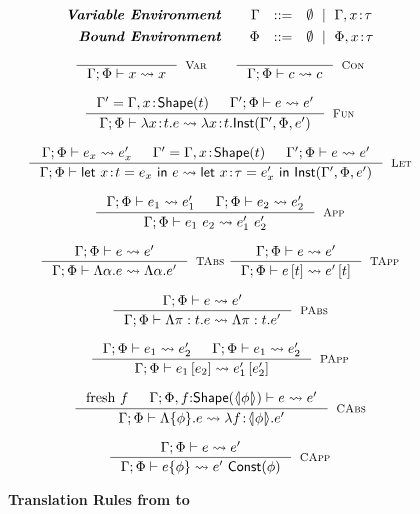 \begin{figure}[t!]
$$
\begin{array}{rrcl}
\centering
 \emphbf{Variable Environment} \quad 
   & \cenv & ::=
   & \emptyset \spmid  \EXT{\cenv}{x}{\utyp}
   \\[0.05in]
 
 \emphbf{Bound Environment} \quad 
   & \benv & ::=
   & \emptyset \spmid  \EXT{\benv}{x}{\utyp}
\end{array}
$$

$$
\inference{
}{
	\txexpr{\cenv}{\benv}{x}{x}
}[\txVar]
\qquad
\inference{
}{
	\txexpr{\cenv}{\benv}{c}{c}
}[\txCon]
$$

$$
\inference{
	\cenv' = \EXT{\cenv}{x}{\toshape{\rtyp}} && \txexpr{\cenv'}{\benv}{e}{e'} 
}{
	\txexpr{\cenv}{\benv}{\efunt{x}{\rtyp}{e}}{\efunt{x}{\rtyp}{\closure{\cenv'}{\benv}{e'}{x\colon\rtyp}}}
}[\txFun]
$$
 
$$
\inference{
	\txexpr{\cenv}{\benv}{e_x}{e_x'} && \cenv' = \EXT{\cenv}{x}{\toshape{\rtyp}} &&
	\txexpr{\cenv'}{\benv}{e}{e'}
}{
	\txexpr{\cenv}{\benv}{\elet{x}{e_x}{e}{\rtyp}}
	{\elet{x}{e_x'}{\closure{\cenv'}{\benv}{e'}}{\tau}{x\colon\rtyp}}
}[\txLet]
$$

$$
\inference{
	\txexpr{\cenv}{\benv}{e_1}{e_1'} &&
	\txexpr{\cenv}{\benv}{e_2}{e_2'}
}{
	\txexpr{\cenv}{\benv}{\eapp{e_1}{e_2}}{\eapp{e_1'}{e_2'}}
}[\txApp]
$$

$$
\inference{
	\txexpr{\cenv}{\benv}{e}{e'}
}{
	\txexpr{\cenv}{\benv}{\etabs{\alpha}{e}}{\etabs{\alpha}{e'}}
}[\txTAbs]
\
\inference{
	\txexpr{\cenv}{\benv}{e}{e'}
}{
	\txexpr{\cenv}{\benv}{\etapp{e}{\rtyp}}{\etapp{e'}{\rtyp}}
}[\txTApp]
$$

$$
\inference{
	\txexpr{\cenv}{\benv}{e}{e'}
}{
	\txexpr{\cenv}{\benv}{\epabs{\rvar}{\rtyp}{e}}{\epabs{\rvar}{\rtyp}{e'}}
}[\txPAbs]
$$
 
$$
\inference{
	\txexpr{\cenv}{\benv}{e_1}{e_2'} &&
	\txexpr{\cenv}{\benv}{e_1}{e_2'}
}{
	\txexpr{\cenv}{\benv}{\epapp{e_1}{e_2}}{\epapp{e_1'}{e_2'}}
}[\txPApp]
$$
 
$$
\inference{
	\text{fresh}\ f &&
	\txexpr{\cenv}{\benv, f\colon\toshape{\txbound{\constraint}}}{e}{e'}
}{
	\txexpr{\cenv}{\benv}{\econstraint{\constraint}{e} }{\efunt{f}{\txbound{\constraint}}{e'}}
}[\txCAbs]
$$

$$
\inference{
	\txexpr{\cenv}{\benv}{e}{e'}
}{
	\txexpr{\cenv}{\benv}{\econstantconstraint{e}{\constraint}}{\eapp{e'}{\ctofun{\constraint}}}
}[\txCApp]
$$
\caption{\textbf{Translation Rules from \boundedcorelan to  \corelan}}
\label{fig:translation}
\end{figure}

